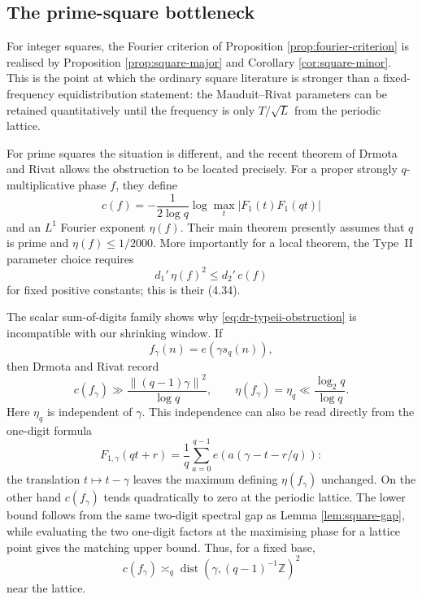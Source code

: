\documentclass[11pt,reqno]{amsart}
\theoremstyle{plain}
\theoremstyle{definition}
\newcommand{\Z}{\mathbb{Z}}
\newcommand{\ee}[1]{e\!\left(#1\right)}
\newcommand{\1}{\mathbf 1}
\newcommand{\norm}[1]{\left\lVert #1\right\rVert}
\DeclareMathOperator{\dist}{dist}
\begin{document}
\subsection{The prime-square bottleneck}

For integer squares, the Fourier criterion of Proposition \ref{prop:fourier-criterion} is realised by Proposition \ref{prop:square-major} and Corollary \ref{cor:square-minor}.  This is the point at which the ordinary square literature is stronger than a fixed-frequency equidistribution statement: the Mauduit--Rivat parameters can be retained quantitatively until the frequency is only $T/\sqrt L$ from the periodic lattice.

For prime squares the situation is different, and the recent theorem of Drmota and Rivat \cite{dr-primesquares} allows the obstruction to be located precisely.  For a proper strongly $q$-multiplicative phase $f$, they define
\[
 c(f)=-\frac{1}{2\log q}
 \log\max_t|F_1(t)F_1(qt)|
\]
and an $L^1$ Fourier exponent $\eta(f)$.  Their main theorem presently assumes that $q$ is prime and $\eta(f)\le1/2000$.  More importantly for a local theorem, the Type~II parameter choice requires
\begin{equation}\label{eq:dr-typeii-obstruction}
 d_1'\,\eta(f)^2\le d_2'\,c(f)
\end{equation}
for fixed positive constants; this is their (4.34).

The scalar sum-of-digits family shows why \eqref{eq:dr-typeii-obstruction} is incompatible with our shrinking window.  If
\[
 f_\gamma(n)=\ee{\gamma s_q(n)},
\]
then Drmota and Rivat record
\begin{equation}\label{eq:dr-c-eta-sod}
 c(f_\gamma)\gg
 \frac{\norm{(q-1)\gamma}^2}{\log q},
 \qquad
 \eta(f_\gamma)=\eta_q\ll\frac{\log_2q}{\log q}.
\end{equation}
Here $\eta_q$ is independent of $\gamma$.  This independence can also be read directly from the one-digit formula
\[
 F_{1,\gamma}(qt+r)=
 \frac1q\sum_{a=0}^{q-1}
 \ee{a(\gamma-t-r/q)}:
\]
the translation $t\mapsto t-\gamma$ leaves the maximum defining $\eta(f_\gamma)$ unchanged.  On the other hand $c(f_\gamma)$ tends quadratically to zero at the periodic lattice.  The lower bound follows from the same two-digit spectral gap as Lemma \ref{lem:square-gap}, while evaluating the two one-digit factors at the maximising phase for a lattice point gives the matching upper bound.  Thus, for a fixed base,
\begin{equation}\label{eq:dr-c-shrinking}
 c(f_\gamma)\asymp_q\dist\!\left(\gamma,(q-1)^{-1}\Z\right)^2
\end{equation}
near the lattice.
\end{document}
